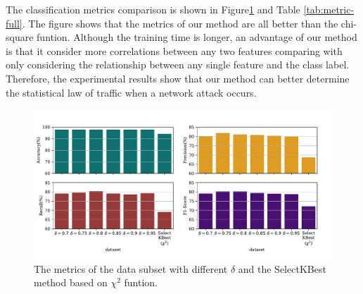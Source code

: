 \documentclass{ieeeaccess}
\theoremstyle{definition}
\begin{document}
The classification metrics comparison is shown in Figure\ref{fig:metrics-chi2} and Table \ref{tab:metric-full}. The figure shows that the metrics of our method are all better than the chi-square funtion. Although the training time is longer, an advantage of our method is that it consider more correlations between any two features comparing with only considering the relationship between any single feature and the class label. Therefore, the experimental results show that our method can better determine the statistical law of traffic when a network attack occurs.

\begin{figure}[!htpb]
    \centering
    \includegraphics[scale=0.35]{fig/metrics-chi2.pdf}
    \caption{The metrics of the data subset with different $\delta$ and the SelectKBest method based on $\chi^2$ funtion.}
    \label{fig:metrics-chi2}
\end{figure}

\end{document}
